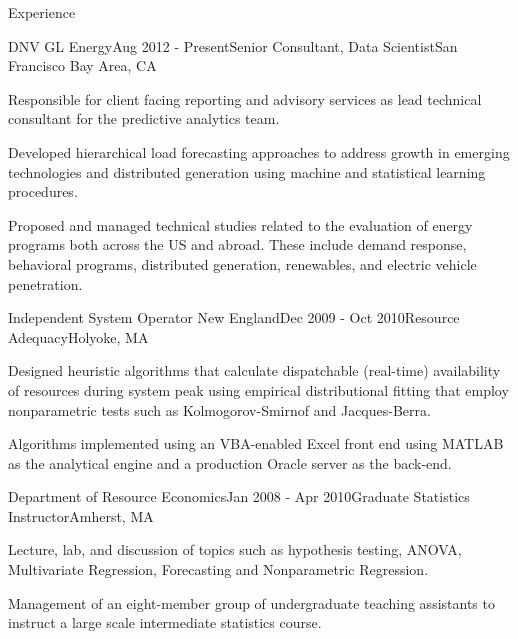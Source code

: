 \documentclass{resume} %
\begin{document}

\begin{rSection}{Experience}

\begin{rSubsection}{DNV GL Energy}{Aug 2012 - Present}{Senior Consultant, Data Scientist}{San Francisco Bay Area, CA}
\item Responsible for client facing reporting and advisory services as lead technical consultant for the  predictive analytics team.
\item Developed hierarchical load forecasting approaches to address growth in emerging technologies and distributed generation using machine and statistical learning procedures.
\item Proposed and managed technical studies related to the evaluation of energy programs both across the US and abroad. These include demand response, behavioral programs, distributed generation, renewables, and electric vehicle  penetration. 

\end{rSubsection}


\begin{rSubsection}{Independent System Operator New England}{Dec 2009 - Oct 2010}{Resource Adequacy}{Holyoke, MA}

\item Designed heuristic algorithms that calculate dispatchable (real-time) availability of resources during system peak using empirical distributional fitting that employ nonparametric tests such as Kolmogorov-Smirnof and Jacques-Berra.
\item Algorithms implemented using an VBA-enabled Excel front end using MATLAB as the analytical engine and a production Oracle server as the back-end.

\end{rSubsection}


\begin{rSubsection}{Department of Resource Economics}{Jan 2008 - Apr 2010}{Graduate Statistics Instructor}{Amherst, MA}
\item Lecture, lab, and discussion of topics such as hypothesis testing, ANOVA, Multivariate Regression, Forecasting and Nonparametric Regression.
\item Management of an eight-member group of undergraduate teaching assistants to instruct a large scale intermediate statistics course.
\end{rSubsection}

\end{rSection}
\end{document}
